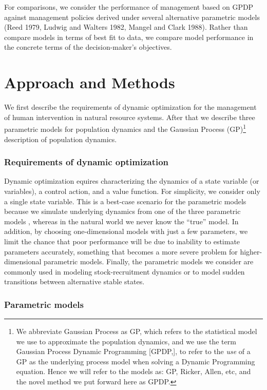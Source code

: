 \documentclass[author-year, 12pt,review]{components/elsarticle} %
\begin{document}
For comparisons, we consider the performance of management based on GPDP
against management policies derived under several alternative parametric
models (Reed 1979, Ludwig and Walters 1982, Mangel and Clark 1988).
Rather than compare models in terms of best fit to data, we compare
model performance in the concrete terms of the decision-maker's
objectives.

\section{Approach and Methods}\label{approach-and-methods}

We first describe the requirements of dynamic optimization for the
management of human intervention in natural resource systems. After that
we describe three parametric models for population dynamics and the
Gaussian Process (GP)\footnote{We abbreviate Gaussian Process as GP,
  which refers to the statistical model we use to approximate the
  population dynamics, and we use the term Gaussian Process Dynamic
  Programming {[}GPDP,{]}, to refer to the \emph{use} of a GP as the
  underlying process model when solving a Dynamic Programming equation.
  Hence we will refer to the models as: GP, Ricker, Allen, etc, and the
  novel method we put forward here as GPDP.} description of population
dynamics.

\subsubsection{Requirements of dynamic
optimization}\label{requirements-of-dynamic-optimization}

Dynamic optimization equires characterizing the dynamics of a state
variable (or variables), a control action, and a value function. For
simplicity, we consider only a single state variable. This is a
best-case scenario for the parametric models because we simulate
underlying dynamics from one of the three parametric models , whereas in
the natural world we never know the ``true'' model. In addition, by
choosing one-dimensional models with just a few parameters, we limit the
chance that poor performance will be due to inability to estimate
parameters accurately, something that becomes a more severe problem for
higher-dimensional parametric models. Finally, the parametric models we
consider are commonly used in modeling stock-recruitment dynamics or to
model sudden transitions between alternative stable states.

\subsubsection{Parametric models}\label{parametric-models}
\end{document}
